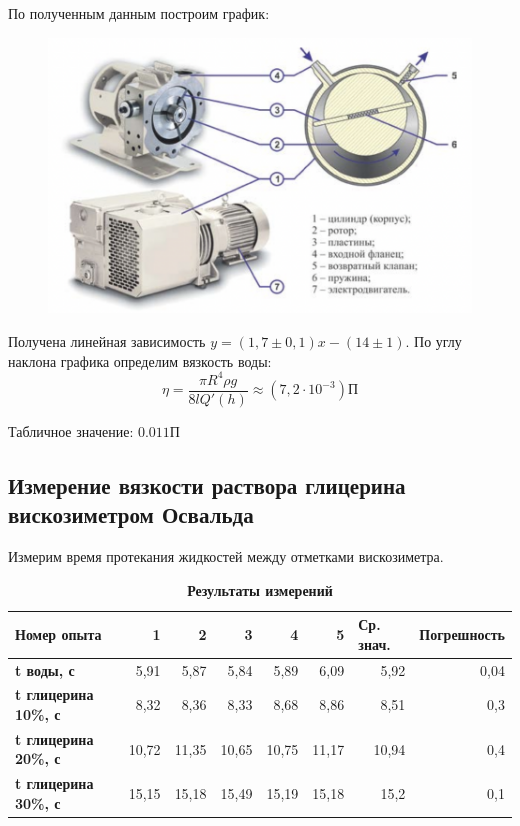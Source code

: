 \documentclass[11pt]{article}
\begin{document}
\begin{enumerate}
    По полученным данным построим график:

    \begin{figure}[H]
    \centering
    \captionsetup{justification=centering}
    \includegraphics[width=\textwidth]{Рис1.png}
    \caption{}
    \end{figure}

    Получена линейная зависимость $y = (1,7\pm 0,1)x - (14\pm1)$. По углу наклона графика определим вязкость воды:
    \[ \eta = \frac{\pi R^4 \rho g}{8lQ'(h)} \approx (7,2\cdot 10^{-3})П\]

    Табличное значение: $0.011 П$
\subsection{Измерение вязкости раствора глицерина вискозиметром Освальда}

    Измерим время протекания жидкостей между отметками вискозиметра.

    \begin{table}[H]
    \centering
    \caption {\textbf{Результаты измерений}}
    \begin{tabular}{|l|r|r|r|r|r|r|r|}
    \hline
    \textbf{Номер опыта}         & 1     & 2     & 3     & 4     & 5     & \multicolumn{1}{l|}{Ср. знач.} & \multicolumn{1}{l|}{Погрешность} \\ \hline
    \textbf{t воды, с}           & 5,91  & 5,87  & 5,84  & 5,89  & 6,09  & 5,92                           & 0,04                             \\ \hline
    \textbf{t глицерина 10\%, с} & 8,32  & 8,36  & 8,33  & 8,68  & 8,86  & 8,51                           & 0,3                              \\ \hline
    \textbf{t глицерина 20\%, с} & 10,72 & 11,35 & 10,65 & 10,75 & 11,17 & 10,94                          & 0,4                              \\ \hline
    \textbf{t глицерина 30\%, с} & 15,15 & 15,18 & 15,49 & 15,19 & 15,18 & 15,2                           & 0,1                              \\ \hline
    \end{tabular}
    \end{table}


\end{enumerate}
\end{document}
